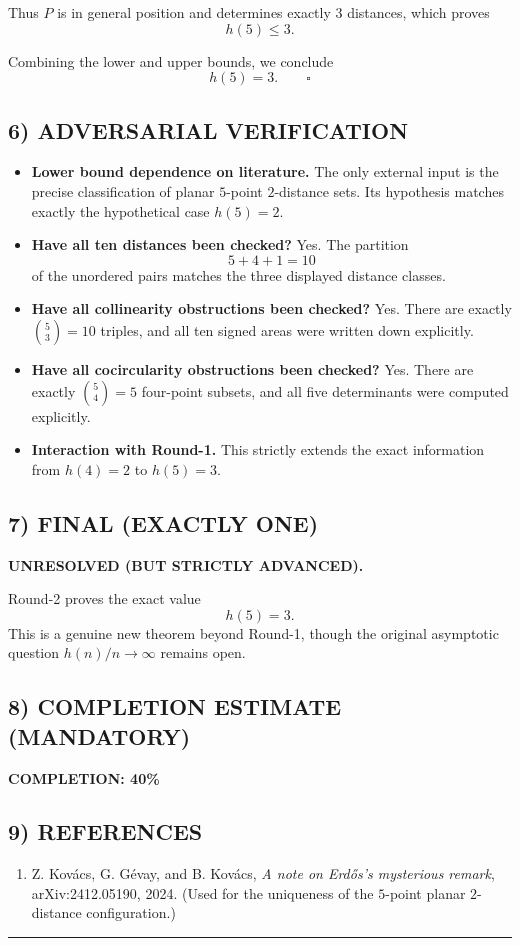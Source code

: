 Thus $P$ is in general position and determines exactly $3$ distances, which proves
\[
h(5)\le 3.
\]

Combining the lower and upper bounds, we conclude
\[
h(5)=3.\qquad \square
\]

\subsection*{6) ADVERSARIAL VERIFICATION}

\begin{itemize}
\item \textbf{Lower bound dependence on literature.} The only external input is the precise classification of planar $5$-point $2$-distance sets. Its hypothesis matches exactly the hypothetical case $h(5)=2$.
\item \textbf{Have all ten distances been checked?} Yes. The partition
\[
5+4+1=10
\]
of the unordered pairs matches the three displayed distance classes.
\item \textbf{Have all collinearity obstructions been checked?} Yes. There are exactly $\binom53=10$ triples, and all ten signed areas were written down explicitly.
\item \textbf{Have all cocircularity obstructions been checked?} Yes. There are exactly $\binom54=5$ four-point subsets, and all five determinants were computed explicitly.
\item \textbf{Interaction with Round-1.} This strictly extends the exact information from $h(4)=2$ to $h(5)=3$.
\end{itemize}

\subsection*{7) FINAL (EXACTLY ONE)}

\textbf{UNRESOLVED (BUT STRICTLY ADVANCED).}

Round-2 proves the exact value
\[
h(5)=3.
\]
This is a genuine new theorem beyond Round-1, though the original asymptotic question $h(n)/n\to\infty$ remains open.

\subsection*{8) COMPLETION ESTIMATE (MANDATORY)}

\textbf{COMPLETION: 40\%}

\subsection*{9) REFERENCES}

\begin{enumerate}
\item Z. Kov\'acs, G. G\'evay, and B. Kov\'acs, \emph{A note on Erd\H{o}s's mysterious remark}, arXiv:2412.05190, 2024. (Used for the uniqueness of the $5$-point planar $2$-distance configuration.)
\end{enumerate}

\bigskip
\hrule
\bigskip


